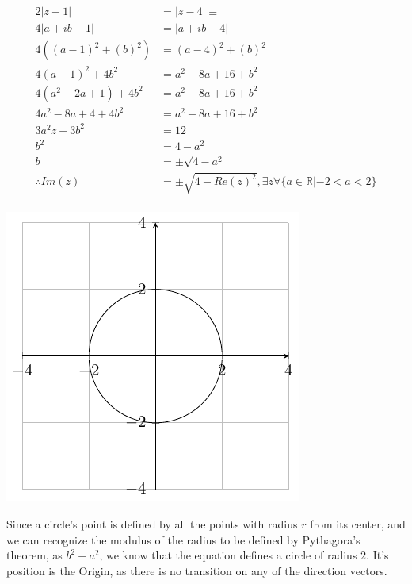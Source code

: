\documentclass{myassignment}
\begin{document}
	\begin{answer}
		\begin{multicols}{2}
			\begin{align*}
				2|z-1| &= |z-4| \equiv \\[2em]
				4|a+ib-1| &= |a+ib-4|\\[1em]
				4((a-1)^2+(b)^2) &= (a-4)^2+(b)^2 \\[1em]
				4(a-1)^2+4b^2 &= a^2-8a+16+b^2 \\[1em]
				4(a^2-2a+1)+4b^2 &= a^2-8a+16+b^2 \\[1em]
				4a^2-8a+4 + 4b^2 &= a^2-8a+16+b^2 \\[1em]
				3a^2z + 3b^2 &= 12 \\[1em]
				b^2 &= 4 - a^2 \\[1em]
				b &= \pm \sqrt{4 - a^2}\\[1em]
				\therefore Im(z) &= \pm\sqrt{4 - Re(z)^2}, \exists z \forall \{a \in \mathbb{R}| -2 < a <2 \} \\[1em]
			\end{align*}

		\columnbreak
		\includegraphics{graphact4.pdf}
		\end{multicols}
		Since a circle's point is defined by all the points with radius $r$ from its center, and we can recognize the modulus of the radius to be defined by Pythagora's theorem, as $b^2 + a^2$, we know that the equation defines a circle of radius $2$. It's position is the Origin, as there is no transition on any of the direction vectors.
	\end{answer}
\end{document}
